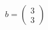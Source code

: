 \documentclass[preview]{standalone}
\begin{document}
\begin{align*}
b = \begin{pmatrix} 3 \\ 3 \end{pmatrix}
\end{align*}
\end{document}
